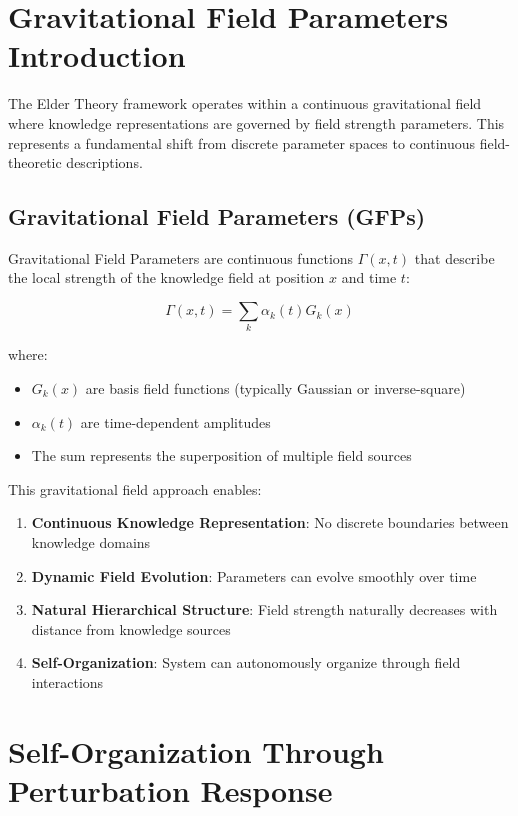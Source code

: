 \section{Gravitational Field Parameters Introduction}

The Elder Theory framework operates within a continuous gravitational field where knowledge representations are governed by field strength parameters. This represents a fundamental shift from discrete parameter spaces to continuous field-theoretic descriptions.

\subsection{Gravitational Field Parameters (GFPs)}

Gravitational Field Parameters are continuous functions $\Gamma(x, t)$ that describe the local strength of the knowledge field at position $x$ and time $t$:

\begin{equation}
\Gamma(x, t) = \sum_{k} \alpha_k(t) G_k(x)
\end{equation}

where:
\begin{itemize}
    \item $G_k(x)$ are basis field functions (typically Gaussian or inverse-square)
    \item $\alpha_k(t)$ are time-dependent amplitudes
    \item The sum represents the superposition of multiple field sources
\end{itemize}

This gravitational field approach enables:
\begin{enumerate}
    \item \textbf{Continuous Knowledge Representation}: No discrete boundaries between knowledge domains
    \item \textbf{Dynamic Field Evolution}: Parameters can evolve smoothly over time
    \item \textbf{Natural Hierarchical Structure}: Field strength naturally decreases with distance from knowledge sources
    \item \textbf{Self-Organization}: System can autonomously organize through field interactions
\end{enumerate}

\section{Self-Organization Through Perturbation Response}

